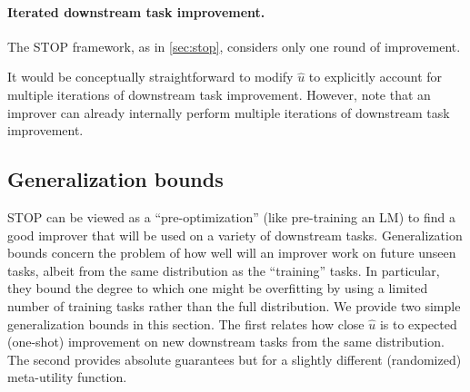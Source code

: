 \documentclass{article}
\newcommand{\metautil}{{\hat{u}}}
\begin{document}
\paragraph{Iterated downstream task improvement.}
The STOP framework, as in \cref{sec:stop}, considers only one round of improvement. 

It would be conceptually straightforward to modify $\metautil$ to explicitly account for multiple iterations of downstream task improvement. However, note that an improver can already internally perform multiple iterations of downstream task improvement. 

\subsection{Generalization bounds}
STOP can be viewed as a ``pre-optimization'' (like pre-training an LM) to find a good improver that will be used on a variety of downstream tasks.
Generalization bounds concern the problem of how well will an improver work on future unseen tasks, albeit from the same distribution as the ``training'' tasks. In particular, they bound the degree to which one might be overfitting by using a limited number of training tasks rather than the full distribution. We provide two simple generalization bounds in this section. The first relates how close $\metautil$ is to expected (one-shot) improvement on new downstream tasks from the same distribution. The second provides absolute guarantees but for a slightly different (randomized) meta-utility function.
\end{document}
